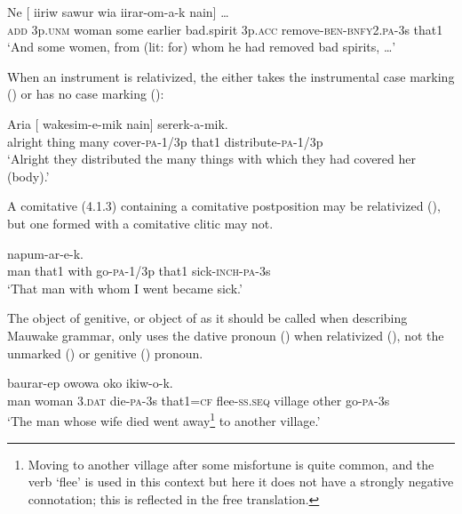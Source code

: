 \ea%
\label{ex:x1547}
\gll Ne  [      iiriw  sawur  wia iirar-om-a-k  nain]  {\dots}\\
\textsc{add} 3p.\textsc{unm} woman  some  earlier  bad.spirit 3p.\textsc{acc} remove-\textsc{ben}-\textsc{bnfy}2.\textsc{pa}-3s  that1\\
\glt`And some women, from (lit: for) whom he had removed bad spirits, {\dots}'
\z


When an instrument is relativized, the  either takes the instrumental case marking () or has no case marking (): 

\ea%
\label{ex:x1553}
\gll Aria  [   wakesim-e-mik  nain]  sererk-a-mik.\\
alright  thing  many  cover-\textsc{pa}-1/3p  that1  distribute-\textsc{pa}-1/3p\\
\glt`Alright they distributed the many things with which they had covered her (body).'
\z


A comitative  (4.1.3) containing a comitative postposition may be relativized (), but one formed with a comitative clitic may not. 

\ea%
\label{ex:x1542}
  napum-ar-e-k. \\
man  that1  with  go-\textsc{pa}-1/3p  that1 sick-\textsc{inch}-\textsc{pa}-3s\\
\glt`That man with whom I went became sick.'
\z


The object of genitive, or object of  as it should be called when describing Mauwake grammar, only uses the dative pronoun () when relativized (), not the unmarked () or genitive () pronoun.

\ea%
\label{ex:x1543}
\gll [\textbf{Mua}  emeria  \textbf{wiar}  um-o-k  nain=ke]  baurar-ep owowa  oko  ikiw-o-k.\\
man  woman  3.\textsc{dat}  die-\textsc{pa}-3s that1=\textsc{cf} flee-\textsc{ss}.\textsc{seq} village  other go-\textsc{pa}-3s\\
\glt`The man whose wife died went away\footnote{Moving to another village after some misfortune is quite common, and the verb `flee' is used in this context but here it does not have a strongly negative connotation; this is reflected in the free translation.} to another village.'
\z


